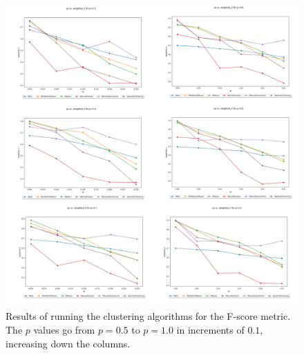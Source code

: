 \documentclass{article}
\begin{document}
\begin{figure}[H]
    \centering
    \includegraphics[width=1.15\textwidth]{results/results_weighted_ri.png}
    \caption[Clustering weighted RI (F-score) results]{Results of running the clustering algorithms for the F-score metric. The $p$ values go from $p=0.5$ to $p=1.0$ in increments of $0.1$, increasing down the columns.}
    \label{fig:results_weighted_ri}
\end{figure}
\end{document}

